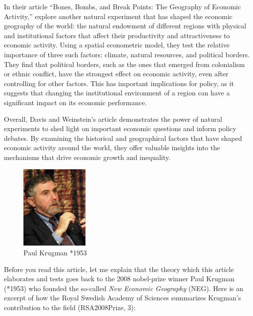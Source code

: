 \documentclass[
  12pt,
  oneside]{book}
\theoremstyle{definition}
\theoremstyle{definition}
\theoremstyle{definition}
\theoremstyle{definition}
\theoremstyle{remark}
\begin{document}
In their article ``Bones, Bombs, and Break Points: The Geography of Economic Activity,'' \citet{Davis2002Bones} explore another natural experiment that has shaped the economic geography of the world: the natural endowment of different regions with physical and institutional factors that affect their productivity and attractiveness to economic activity. Using a spatial econometric model, they test the relative importance of three such factors: climate, natural resources, and political borders. They find that political borders, such as the ones that emerged from colonialism or ethnic conflict, have the strongest effect on economic activity, even after controlling for other factors. This has important implications for policy, as it suggests that changing the institutional environment of a region can have a significant impact on its economic performance.

Overall, Davis and Weinstein's article demonstrates the power of natural experiments to shed light on important economic questions and inform policy debates. By examining the historical and geographical factors that have shaped economic activity around the world, they offer valuable insights into the mechanisms that drive economic growth and inequality.

\begin{figure}
\centering
\includegraphics[width=0.3\textwidth,height=\textheight]{fig/krugman.jpeg}
\caption[\label{fig:krugman} Paul Krugman *1953]{\label{fig:krugman} Paul Krugman *1953\footnotemark{}}
\end{figure}

Before you read this article, let me explain that the theory which this article elaborates and tests goes back to the 2008 nobel-prize winner Paul Krugman (*1953) who founded the so-called \emph{New Economic Geography} (NEG).
Here is an excerpt of how the Royal Swedish Academy of Sciences summarizes Krugman's contribution to the field (RSA2008Prize, 3):
\end{document}
